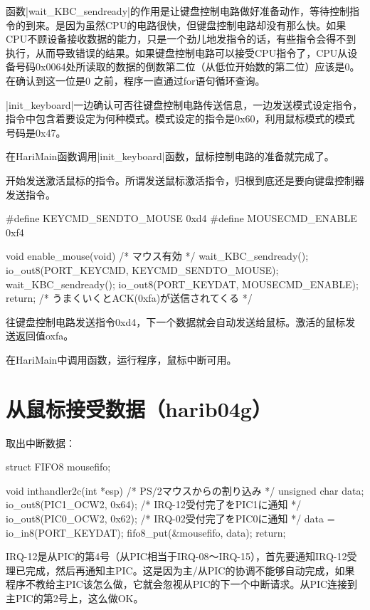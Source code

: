 函数|wait_KBC_sendready|的作用是让键盘控制电路做好准备动作，等待控制指令的到来。是因为虽然CPU的电路很快，但键盘控制电路却没有那么快。如果CPU不顾设备接收数据的能力，只是一个劲儿地发指令的话，有些指令会得不到执行，从而导致错误的结果。如果键盘控制电路可以接受CPU指令了，CPU从设备号码0x0064处所读取的数据的倒数第二位（从低位开始数的第二位）应该是0。在确认到这一位是0 之前，程序一直通过for语句循环查询。

|init_keyboard|一边确认可否往键盘控制电路传送信息，一边发送模式设定指令，指令中包含着要设定为何种模式。模式设定的指令是0x60，利用鼠标模式的模式号码是0x47。

在HariMain函数调用|init_keyboard|函数，鼠标控制电路的准备就完成了。

\cs

开始发送激活鼠标的指令。所谓发送鼠标激活指令，归根到底还是要向键盘控制器发送指令。
\begin{code}
#define KEYCMD_SENDTO_MOUSE		0xd4
#define MOUSECMD_ENABLE			0xf4

void enable_mouse(void)
{
	/* マウス有効 */
	wait_KBC_sendready();
	io_out8(PORT_KEYCMD, KEYCMD_SENDTO_MOUSE);
	wait_KBC_sendready();
	io_out8(PORT_KEYDAT, MOUSECMD_ENABLE);
	return; /* うまくいくとACK(0xfa)が送信されてくる */
}
\end{code}

往键盘控制电路发送指令0xd4，下一个数据就会自动发送给鼠标。激活的鼠标发送返回值oxfa。

在HariMain中调用函数，运行程序，鼠标中断可用。

\section{	从鼠标接受数据（harib04g）	}

取出中断数据：
\begin{code}
struct FIFO8 mousefifo;

void inthandler2c(int *esp)
/* PS/2マウスからの割り込み */
{
	unsigned char data;
	io_out8(PIC1_OCW2, 0x64);	/* IRQ-12受付完了をPIC1に通知 */
	io_out8(PIC0_OCW2, 0x62);	/* IRQ-02受付完了をPIC0に通知 */
	data = io_in8(PORT_KEYDAT);
	fifo8_put(&mousefifo, data);
	return;
}
\end{code}

IRQ-12是从PIC的第4号（从PIC相当于IRQ-08～IRQ-15），首先要通知IRQ-12受理已完成，然后再通知主PIC。这是因为主/从PIC的协调不能够自动完成，如果程序不教给主PIC该怎么做，它就会忽视从PIC的下一个中断请求。从PIC连接到主PIC的第2号上，这么做OK。

\cs

